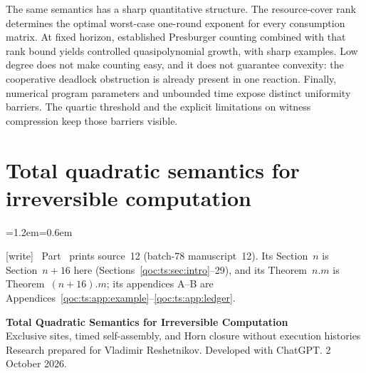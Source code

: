 \documentclass[11pt,letterpaper]{article}
\theoremstyle{definition}
\theoremstyle{remark}
\newcommand{\wtag}{\textup{[write]}}
\newenvironment{writenote}{\par\smallskip\begin{list}{}{\leftmargin=1.2em\rightmargin=0.6em}\item[]\small\wtag\ }{\end{list}\smallskip}
\begin{document}
The same semantics has a sharp quantitative structure. The resource-cover
rank determines the optimal worst-case one-round exponent for every
consumption matrix. At fixed horizon, established Presburger counting
combined with that rank bound yields controlled quasipolynomial growth,
with sharp examples. Low degree does not make counting easy, and it does
not guarantee convexity: the cooperative deadlock obstruction is already
present in one reaction. Finally, numerical program parameters and
unbounded time expose distinct uniformity barriers. The quartic threshold
and the explicit limitations on witness compression keep those barriers
visible.


\clearpage
\part{Total quadratic semantics for irreversible computation}\label{qoc:part:ts}

\begin{writenote}
Part~\ref{qoc:part:ts} prints source~12 (batch-78 manuscript~12). Its Section~$n$ is Section~$n+16$ here (Sections~\ref{qoc:ts:sec:intro}--29), and its Theorem~$n.m$ is Theorem~$(n+16).m$; its appendices A--B are Appendices~\ref{qoc:ts:app:example}--\ref{qoc:ts:app:ledger}.
\end{writenote}

\begin{center}
{\large\bfseries Total Quadratic Semantics for Irreversible Computation}\\[3pt]
{Exclusive sites, timed self-assembly, and Horn closure without execution histories}\\[3pt]
{\small Research prepared for Vladimir Reshetnikov. Developed with ChatGPT. 2 October 2026.}
\end{center}
\end{document}
